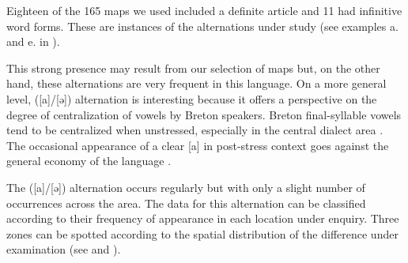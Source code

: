 \documentclass[output=paper]{LSP/langsci}
\begin{document}
\begin{table}
\caption{Phonetic contexts for the alternations ([a]/[ə])}
\label{tab:5}
\end{table}

Eighteen of the 165 maps we used included a definite article and 11 had infinitive word forms. These are instances of the alternations under study (see examples a. and e. in ).

This strong presence may result from our selection of maps but, on the other hand, these alternations are very frequent in this language. On a more general level, ([a]/[ə]) alternation is interesting because it offers a perspective on the degree of centralization of vowels by Breton speakers. Breton final-syllable vowels tend to be centralized when unstressed, especially in the central dialect area \citep[8-10]{wmffre_central_1998}. The occasional appearance of a clear [a] in post-stress context goes against the general economy of the language \citep{martinet_economie_1955}.

The ([a]/[ə]) alternation occurs regularly but with only a slight number of occurrences across the area. The data for this alternation can be classified according to their frequency of appearance in each location under enquiry. Three zones can be spotted according to the spatial distribution of the difference under examination (see  and ).
\end{document}
